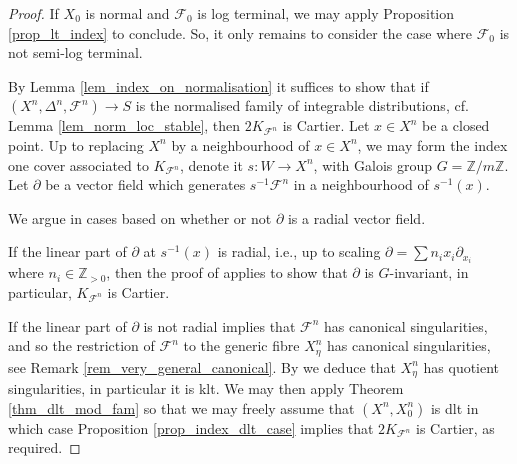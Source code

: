 \documentclass[12pt, a4paper]{amsart}
\newcounter{Theorem}
\theoremstyle{definition}
\theoremstyle{named}
\begin{document}
\begin{proof}
If $X_0$ is normal and $\mathcal F_0$ is log terminal, we may apply Proposition \ref{prop_lt_index} to conclude.  So, it only remains to consider the case where $\mathcal F_0$ is not semi-log terminal.

By Lemma \ref{lem_index_on_normalisation} it suffices to show that if $(X^n, \Delta^n, \mathcal F^n)\to S$ is the 
normalised family of integrable distributions, cf. Lemma \ref{lem_norm_loc_stable},
then $2K_{\mathcal F^n}$ is Cartier.
Let $x \in X^n$ be a closed point.  Up to replacing $X^n$ by a neighbourhood of $x \in X^n$, we may form the index one cover associated to $K_{\mathcal F^n}$, denote it $s\colon W \to X^n$, with Galois group $G = \mathbb Z/m\mathbb Z$.  Let $\partial$ be a vector field which generates $s^{-1}\mathcal F^n$ in a neighbourhood of $s^{-1}(x)$.

We argue in cases based on whether or not $\partial$ is a radial vector field.


If the linear part of $\partial$ at $s^{-1}(x)$ is radial, i.e., up to scaling 
$\partial = \sum n_ix_i\partial_{x_i}$ where $n_i \in \mathbb Z_{>0}$, then
the proof of \cite[Lemma 2.11]{SS23} applies to show that $\partial$ is $G$-invariant, in particular, $K_{\mathcal F^n}$ is Cartier.

If the linear part of $\partial$ is not radial \cite[Fact III.i.3]{MP13}
implies that $\mathcal F^n$ has canonical singularities, and so the restriction 
of $\mathcal F^n$ to the generic fibre $X^n_\eta$ has canonical singularities, see Remark \ref{rem_very_general_canonical}.
By \cite[Fact I.2.4]{McQuillan08} we deduce that $X^n_\eta$ has quotient singularities, in particular it is klt.
    We may then apply Theorem \ref{thm_dlt_mod_fam} so that
     we may freely assume that $(X^n, X^n_0)$ is dlt
     in which case Proposition 
     \ref{prop_index_dlt_case} implies that $2K_{\mathcal F^n}$ is Cartier, as required.
\end{proof}
\end{document}
